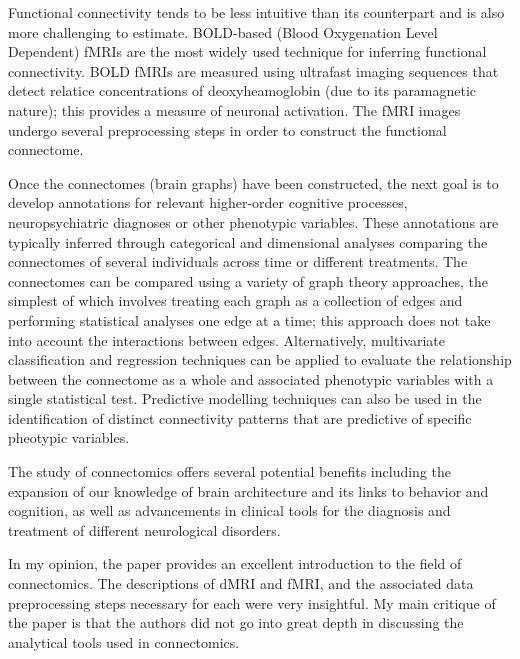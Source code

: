 \documentclass[11pt, letterpaper]{article}
\begin{document}
Functional connectivity tends to be less intuitive than its counterpart and is 
also more challenging to estimate. BOLD-based (Blood Oxygenation Level Dependent) 
fMRIs are the most widely used technique for inferring functional connectivity. 
BOLD fMRIs are measured using ultrafast imaging sequences that detect relatice 
concentrations of deoxyheamoglobin (due to its paramagnetic nature); this 
provides a measure of neuronal activation. The fMRI images undergo several 
preprocessing steps in order to construct the functional connectome.

Once the connectomes (brain graphs) have been constructed, the next goal is to 
develop annotations for relevant higher-order cognitive processes, 
neuropsychiatric diagnoses or other phenotypic variables. These annotations are 
typically inferred through categorical and dimensional analyses comparing the 
connectomes of several individuals across time or different treatments. The 
connectomes can be compared using a variety of graph theory approaches, the 
simplest of which involves treating each graph as a collection of edges and 
performing statistical analyses one edge at a time; this approach does not take 
into account the interactions between edges. Alternatively, multivariate 
classification and regression techniques can be applied to evaluate the 
relationship between the connectome as a whole and associated phenotypic 
variables with a single statistical test. Predictive modelling techniques can 
also be used in the identification of distinct connectivity patterns that are 
predictive of specific pheotypic variables.

The study of connectomics offers several potential benefits including the 
expansion of our knowledge of brain architecture and its links to behavior and 
cognition, as well as advancements in clinical tools for the diagnosis and 
treatment of different neurological disorders. 

In my opinion, the paper provides an excellent introduction to the field of 
connectomics. The descriptions of dMRI and fMRI, and the associated data 
preprocessing steps necessary for each were very insightful. My main critique of 
the paper is that the authors did not go into great depth in discussing the 
analytical tools used in connectomics.
\end{document}
